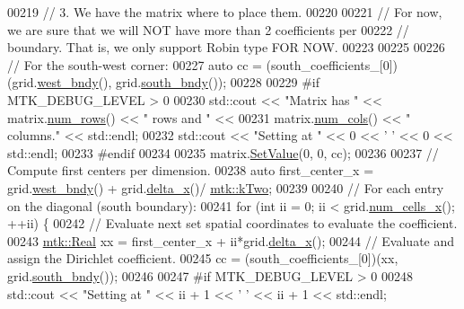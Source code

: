\begin{DoxyCode}
00219   \textcolor{comment}{// 3. We have the matrix where to place them.}
00220 
00221   \textcolor{comment}{// For now, we are sure that we will NOT have more than 2 coefficients per}
00222   \textcolor{comment}{// boundary. That is, we only support Robin type FOR NOW.}
00223 
00225 
00226   \textcolor{comment}{// For the south-west corner:}
00227   \textcolor{keyword}{auto} cc = (south\_coefficients\_[0])(grid.\hyperlink{classmtk_1_1UniStgGrid2D_af2b1712387ded85edaf2b64617d3fc13}{west\_bndy}(), grid.\hyperlink{classmtk_1_1UniStgGrid2D_a1442eaf219f099d0ebf46a170fdebf92}{south\_bndy}());
00228 
00229 \textcolor{preprocessor}{  #if MTK\_DEBUG\_LEVEL > 0}
00230   std::cout << \textcolor{stringliteral}{"Matrix has "} << matrix.\hyperlink{classmtk_1_1DenseMatrix_a53f3afb3b6a8d21854458aaa9663cc74}{num\_rows}() << \textcolor{stringliteral}{" rows and "} <<
00231     matrix.\hyperlink{classmtk_1_1DenseMatrix_a41747502d468c6728a4be31501b16e0e}{num\_cols}() << \textcolor{stringliteral}{" columns."} << std::endl;
00232   std::cout << \textcolor{stringliteral}{"Setting at "} << 0 << \textcolor{charliteral}{' '} << 0 << std::endl;
00233 \textcolor{preprocessor}{  #endif}
00234 
00235   matrix.\hyperlink{classmtk_1_1DenseMatrix_a784ce5784109ac86bfb9d8562b334b13}{SetValue}(0, 0, cc);
00236 
00237   \textcolor{comment}{// Compute first centers per dimension.}
00238   \textcolor{keyword}{auto} first\_center\_x = grid.\hyperlink{classmtk_1_1UniStgGrid2D_af2b1712387ded85edaf2b64617d3fc13}{west\_bndy}() + grid.\hyperlink{classmtk_1_1UniStgGrid2D_aca4710004c4a7da6a9e8fd6ab32a691f}{delta\_x}()/
      \hyperlink{group__c01-roots_gaf39c2d851a2db744f4feb1c5ab3ec2cf}{mtk::kTwo};
00239 
00240   \textcolor{comment}{// For each entry on the diagonal (south boundary):}
00241   \textcolor{keywordflow}{for} (\textcolor{keywordtype}{int} ii = 0; ii < grid.\hyperlink{classmtk_1_1UniStgGrid2D_a2d182866a398aba8e4829590e85bf939}{num\_cells\_x}(); ++ii) \{
00242     \textcolor{comment}{// Evaluate next set spatial coordinates to evaluate the coefficient.}
00243     \hyperlink{group__c01-roots_gac080bbbf5cbb5502c9f00405f894857d}{mtk::Real} xx = first\_center\_x + ii*grid.\hyperlink{classmtk_1_1UniStgGrid2D_aca4710004c4a7da6a9e8fd6ab32a691f}{delta\_x}();
00244     \textcolor{comment}{// Evaluate and assign the Dirichlet coefficient.}
00245     cc = (south\_coefficients\_[0])(xx, grid.\hyperlink{classmtk_1_1UniStgGrid2D_a1442eaf219f099d0ebf46a170fdebf92}{south\_bndy}());
00246 
00247 \textcolor{preprocessor}{    #if MTK\_DEBUG\_LEVEL > 0}
00248     std::cout << \textcolor{stringliteral}{"Setting at "} << ii + 1 << \textcolor{charliteral}{' '} << ii + 1 << std::endl;

\end{DoxyCode}
